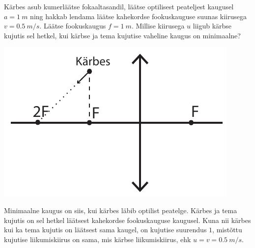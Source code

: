 
Kärbes asub kumerläätse fokaaltasandil, läätse optilisest peateljest kaugusel $a = \SI{1}{m}$ ning hakkab lendama läätse kahekordse fookuskauguse suunas kiirusega $v = \SI{0,5}{m/s}$. Läätse fookuskaugus $f = \SI{1}{m}$. Millise kiirusega $u$ liigub kärbse kujutis sel hetkel, kui kärbse ja tema kujutise vaheline kaugus on minimaalne?
\begin{center}
	\includegraphics[width = 0.5\linewidth]{2018-lahg-01-yl.pdf}
\end{center}\hint

\solu
Minimaalne kaugus on siis, kui kärbes läbib optilist peatelge. Kärbes ja tema kujutis on sel hetkel läätsest kahekordse fookuskauguse kaugusel. Kuna nii kärbes kui ka tema kujutis on läätsest sama kaugel, on kujutise suurendus $1$, mistõttu kujutise liikumiskiirus on sama, mis kärbse liikumiskiirus, ehk $u = v = \SI{0,5}{m/s}$.
\probend